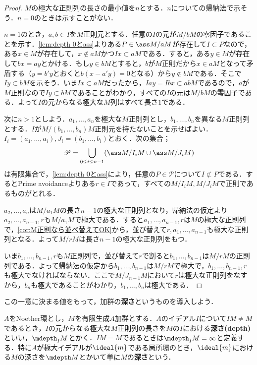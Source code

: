 	\begin{proof}
	$M$の極大な正則列の長さの最小値を$n$とする．$n$についての帰納法で示そう．$n=0$のときは示すことがない．
	
	$n=1$のとき，$a,b\in I$を$M$正則元とする．任意の$I$の元が$M/bM$の零因子であることを示す．\ref{lem:depth 0とass}よりある$P\in\ass M/aM$が存在して$I\subset P$なので，ある$x\in M$が存在して，$x\not\in aM$かつ$Ix\subset aM$である．すると，ある$y\in M$が存在して$bx=ay$とかける．もし$y\in bM$とすると，$b$が$M$正則だから$x\in aM$となって矛盾する（$y=b'y$とおくと$b(x-a'y)=0$となる）から$y\notin bM$である．そこで$Iy\subset bM$を示そう．いま$Ix\subset aM$だったから，$Iay=Ibx\subset abM$であるので，$a$が$M$正則なので$Iy\subset bM$であることがわかり，すべての$I$の元は$M/bM$の零因子である．よって$I$の元からなる極大な$M$列はすべて長さ$1$である．
	
	次に$n>1$としよう．$a_1,\dots,a_n$を極大な$M$正則列とし，$b_1,\dots,b_n$を異なる$M$正則列とする．$I$が$M/(b_1,\dots,b_n)M$正則元を持たないことを示せばよい．$I_i=(a_1,\dots,a_i),J_i=(b_1,\dots,b_i)$とおく．次の集合；
	\[\mathscr{P}=\bigcup_{0\leq i\leq n-1}(\ass M/I_iM\cup \ass M/J_iM)\]
	は有限集合で，\ref{lem:depth 0とass}により，任意の$P\in\mathscr{P}$について$I\not\subset P$である．するとPrime avoidanceよりある$r\in I$であって，すべての$M/I_iM,M/J_iM$で正則であるものがとれる．
	
	$a_2,\dots,a_n$は$M/a_1M$の長さ$n-1$の極大な正則列となり，帰納法の仮定より$a_2,\dots,a_{n-1},r$も$M/a_1M$で極大である．すると$a_1,\dots,a_{n-1},r$は$M$の極大な正則列で，\ref{cor:M正則なら並べ替えてOK}から，並び替えて$r,a_1,\dots,a_{n-1}$も極大な正則列となる．よって$M/rM$は長さ$n-1$の極大な正則列をもつ．
	
	いま$b_1,\dots,b_{n-1},r$も$M$正則列で，並び替えて$r$で割ると$b_1,\dots,b_{n-1}$は$M/rM$の正則列である．よって帰納法の仮定から$b_1,\dots,b_{n-1}$は$M/rM$で極大で，$b_1,\dots,b_{n-1},r$も極大でなければならない．ここで$M/J_{n-1}M$において$r$は極大な正則列をなすから，$b_n$も極大であることがわかり，$b_1,\dots,b_n$は極大である．
\end{proof}

この一意に決まる値をもって，加群の\textbf{深さ}というものを導入しよう．

\begin{defi}[深さ]
	$A$をNoether環とし，$M$を有限生成$A$加群とする．$A$のイデアル$I$について$IM\neq M$であるとき，$I$の元からなる極大な$M$正則列の長さを$M$の$I$における\textbf{深さ(depth)}といい，$\mdepth_I M$とかく．$IM=M$であるときは$\mdepth_I M=\infty$と定義する．特に$A$が極大イデアルが$\ideal{m}$である局所環のとき，$\ideal{m}$における$M$の深さを$\mdepth M$とかいて単に$M$の\textbf{深さ}という．
\end{defi}

